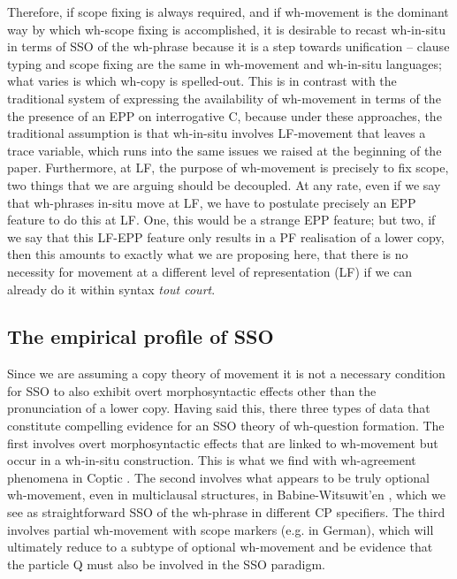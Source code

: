 \documentclass{glossa}
\begin{document}
Therefore, if scope fixing is always required, and if wh-movement is the dominant way by which wh-scope fixing is accomplished, it is desirable to recast wh-in-situ in terms of SSO of the wh-phrase because it is a step towards unification -- clause typing and scope fixing are the same in wh-movement and wh-in-situ languages; what varies is which wh-copy is spelled-out. This is in contrast with the traditional system of expressing the availability of wh-movement in terms of the the presence of an EPP on interrogative C, because under these approaches, the traditional assumption is that wh-in-situ involves LF-movement that leaves a trace variable, which runs into the same issues we raised at the beginning of the paper. Furthermore, at LF, the purpose of wh-movement is precisely to fix scope, two things that we are arguing should be decoupled. At any rate, even if we say that wh-phrases in-situ move at LF, we have to postulate precisely an EPP feature to do this at LF. One, this would be a strange EPP feature; but two, if we say that this LF-EPP feature only results in a PF realisation of a lower copy, then this amounts to exactly what we are proposing here, that there is no necessity for movement at a different level of representation (LF) if we can already do it within syntax \textit{tout court}.


\subsection{The empirical profile of SSO}
Since we are assuming a copy theory of movement it is not a necessary condition for SSO to also exhibit overt morphosyntactic effects other than the pronunciation of a lower copy. Having said this, there three types of data that constitute compelling evidence for an SSO theory of wh-question formation. The first involves overt morphosyntactic effects that are linked to wh-movement but occur in a wh-in-situ construction.  This is what we find with wh-agreement phenomena in Coptic \citep{rlc:2006,reintges:2007}. The second involves what appears to be truly optional wh-movement, even in multiclausal structures, in Babine-Witsuwit'en \citep{denham:1997,denham:2000}, which we see as straightforward SSO of the wh-phrase in different CP specifiers. The third involves partial wh-movement with scope markers (e.g. in German), which will ultimately reduce to a subtype of optional wh-movement and be evidence that the particle Q must also be involved in the SSO paradigm.
\end{document}
